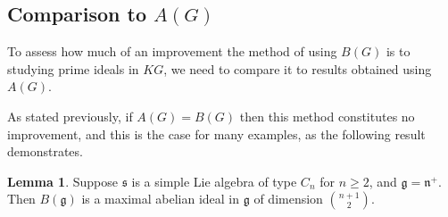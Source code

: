 \documentclass[12pt,a4paper]{article}
\theoremstyle{definition}
\newtheorem{lem}[thm]{Lemma}
\theoremstyle{remark}
\theoremstyle{custthm}
\begin{document}
\subsection{Comparison to $A(G)$}

To assess how much of an improvement the method of using $B(G)$ is to studying prime ideals in $KG$, we need to compare it to results obtained using $A(G)$.

As stated previously, if $A(G)=B(G)$ then this method constitutes no improvement, and this is the case for many examples, as the following result demonstrates.

\begin{lem}\label{lem: type C}
Suppose $\mathfrak{s}$ is a simple Lie algebra of type $C_n$ for $n\geq 2$, and $\mathfrak{g}=\mathfrak{n}^+$. Then $B(\mathfrak{g})$ is a maximal abelian ideal in $\mathfrak{g}$ of dimension $\binom{n+1}{2}$.
\end{lem}
\end{document}
